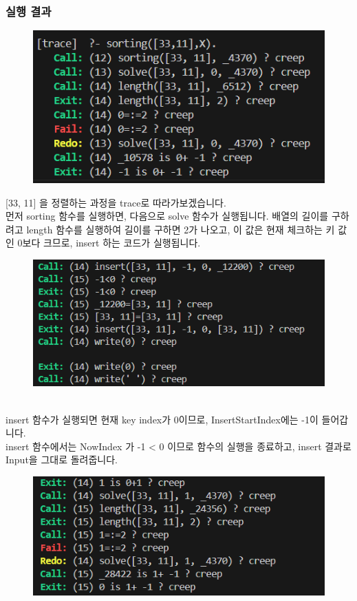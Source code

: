 \documentclass{article}
\begin{document}
\subsubsection{실행 결과}
\begin{figure}[!htb]
    \centering
    \includegraphics[width=0.8\linewidth]{hw5a_1.png}
\end{figure}
[33, 11] 을 정렬하는 과정을 trace로 따라가보겠습니다.\\
먼저 sorting 함수를 실행하면, 다음으로 solve 함수가 실행됩니다.
배열의 길이를 구하려고 length 함수를 실행하여 길이를 구하면 2가 나오고, 이 값은 현재 체크하는 키 값인 0보다 크므로, insert 하는 코드가 실행됩니다.\\
\begin{figure}[!htb]
    \centering
    \includegraphics[width=0.8\linewidth]{hw5a_2.png}
\end{figure}\\
insert 함수가 실행되면 현재 key index가 0이므로, InsertStartIndex에는 -1이 들어갑니다.\\
insert 함수에서는 NowIndex 가 -1 < 0 이므로 함수의 실행을 종료하고, insert 결과로 Input을 그대로 돌려줍니다.\\
\newpage
\begin{figure}[!htb]
    \centering
    \includegraphics[width=0.8\linewidth]{hw5a_3.png}
\end{figure}
\end{document}
